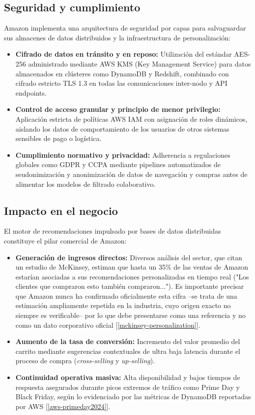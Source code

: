 \documentclass[12pt,a4paper]{article}
\begin{document}
\subsection{Seguridad y cumplimiento}
Amazon implementa una arquitectura de seguridad por capas para salvaguardar sus almacenes de datos distribuidos y la infraestructura de personalización:
\begin{itemize}
    \item \textbf{Cifrado de datos en tránsito y en reposo:} Utilización del estándar AES-256 administrado mediante AWS KMS (Key Management Service) para datos almacenados en clústeres como DynamoDB y Redshift, combinado con cifrado estricto TLS 1.3 en todas las comunicaciones inter-nodo y API endpoints.
    \item \textbf{Control de acceso granular y principio de menor privilegio:} Aplicación estricta de políticas AWS IAM con asignación de roles dinámicos, aislando los datos de comportamiento de los usuarios de otros sistemas sensibles de pago o logística.
    \item \textbf{Cumplimiento normativo y privacidad:} Adherencia a regulaciones globales como GDPR y CCPA mediante pipelines automatizados de seudonimización y anonimización de datos de navegación y compras antes de alimentar los modelos de filtrado colaborativo.
\end{itemize}

\subsection{Impacto en el negocio}
El motor de recomendaciones impulsado por bases de datos distribuidas constituye el pilar comercial de Amazon:
\begin{itemize}
    \item \textbf{Generación de ingresos directos:} Diversos análisis del sector, que citan un estudio de McKinsey, estiman que hasta un 35\% de las ventas de Amazon estarían asociadas a sus recomendaciones personalizadas en tiempo real ("Los clientes que compraron esto también compraron..."). Es importante precisar que Amazon nunca ha confirmado oficialmente esta cifra --se trata de una estimación ampliamente repetida en la industria, cuyo origen exacto no siempre es verificable-- por lo que debe presentarse como una referencia y no como un dato corporativo oficial [\ref{mckinsey-personalization}].
    \item \textbf{Aumento de la tasa de conversión:} Incremento del valor promedio del carrito mediante sugerencias contextuales de ultra baja latencia durante el proceso de compra (\textit{cross-selling} y \textit{up-selling}).
    \item \textbf{Continuidad operativa masiva:} Alta disponibilidad y bajos tiempos de respuesta asegurados durante picos extremos de tráfico como Prime Day y Black Friday, según lo evidenciado por las métricas de DynamoDB reportadas por AWS [\ref{aws-primeday2024}].
\end{itemize}
\end{document}
